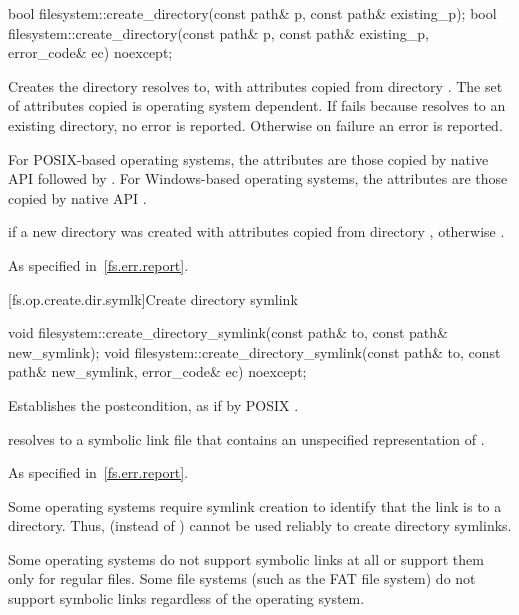 %
\begin{itemdecl}
bool filesystem::create_directory(const path& p, const path& existing_p);
bool filesystem::create_directory(const path& p, const path& existing_p, error_code& ec) noexcept;
\end{itemdecl}

\begin{itemdescr}
\pnum
\effects
Creates the
  directory  resolves to, with
  attributes copied from directory . The set of attributes
  copied is operating system dependent.
  If  fails because  resolves to an existing directory,
  no error is reported. Otherwise on failure an error is reported.
\begin{note}
For POSIX-based operating systems, the
      attributes are those copied by native API 
      followed by . For
      Windows-based operating systems, the attributes are those copied by native
      API .
\end{note}

\pnum
\returns
{} if a new directory was created
  with attributes copied from directory ,
  otherwise .

\pnum
\throws
As specified in~\ref{fs.err.report}.
\end{itemdescr}


[fs.op.create.dir.symlk]{Create directory symlink}

%
\begin{itemdecl}
void filesystem::create_directory_symlink(const path& to, const path& new_symlink);
void filesystem::create_directory_symlink(const path& to, const path& new_symlink,
                              error_code& ec) noexcept;
\end{itemdecl}

\begin{itemdescr}
\pnum
\effects
Establishes the postcondition, as if by POSIX .

\pnum
\ensures
{} resolves to a symbolic link file that
  contains an unspecified representation of .

\pnum
\throws
As specified in~\ref{fs.err.report}.

\pnum
\begin{note}
Some operating systems require symlink creation to
identify that the link is to a directory.
Thus,  (instead of )
cannot be used reliably to create directory symlinks.
\end{note}

\pnum
\begin{note}
Some operating systems do not support symbolic links at all or support
  them only for regular files.
  Some file systems (such as the FAT file system) do not
  support
  symbolic links regardless of the operating system.
\end{note}
\end{itemdescr}

